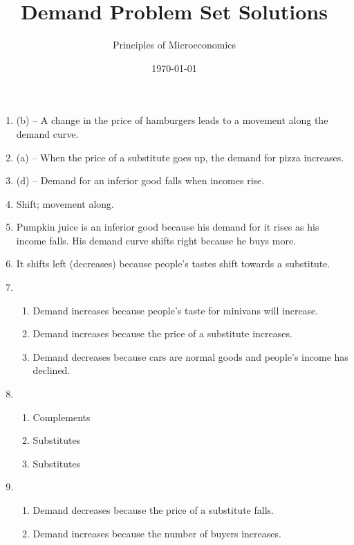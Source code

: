 \documentclass{article}
\title{Demand Problem Set Solutions}
\author{Principles of Microeconomics}
\date{\today}
\begin{document}
\maketitle

\begin{enumerate}

\item (b) -- A change in the price of hamburgers leads to a movement along the demand curve.

\item (a) -- When the price of a substitute goes up, the demand for pizza increases.

\item (d) -- Demand for an inferior good falls when incomes rise.

\item Shift; movement along.

\item Pumpkin juice is an inferior good because his demand for it rises as his income falls. His demand curve shifts right because he buys more. 

\item It shifts left (decreases) because people's tastes shift towards a substitute.

\item 

	\begin{enumerate}
	
	\item Demand increases because people's taste for minivans will increase.
	
	\item Demand increases because the price of a substitute increases.
	
	\item Demand decreases because cars are normal goods and people's income has declined. 
	
	\end{enumerate}
	
\item

	\begin{enumerate}
	
	\item Complements
	
	\item Substitutes
	
	\item Substitutes
	
	\end{enumerate}
	
\item

	\begin{enumerate}
	
	\item Demand decreases because the price of a substitute falls.
	
	\item Demand increases because the number of buyers increases.
	
	\end{enumerate}

\end{enumerate}
\end{document}
